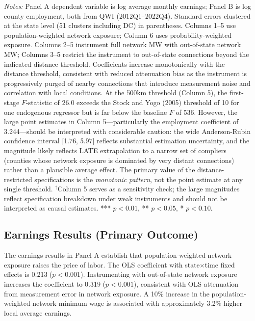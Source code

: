 \documentclass[12pt]{article}
\begin{document}
\begin{table}[t]
\begin{threeparttable}
\begin{tablenotes}[flushleft]
\item \textit{Notes:} Panel A dependent variable is log average monthly earnings; Panel B is log county employment, both from QWI (2012Q1--2022Q4). Standard errors clustered at the state level (51 clusters including DC) in parentheses. Columns 1--5 use population-weighted network exposure; Column 6 uses probability-weighted exposure. Columns 2--5 instrument full network MW with out-of-state network MW; Columns 3--5 restrict the instrument to out-of-state connections beyond the indicated distance threshold. Coefficients increase monotonically with the distance threshold, consistent with reduced attenuation bias as the instrument is progressively purged of nearby connections that introduce measurement noise and correlation with local conditions. At the 500km threshold (Column 5), the first-stage $F$-statistic of 26.0 exceeds the Stock and Yogo (2005) threshold of 10 for one endogenous regressor but is far below the baseline $F$ of 536. However, the large point estimates in Column 5---particularly the employment coefficient of 3.244---should be interpreted with considerable caution: the wide Anderson-Rubin confidence interval [1.76, 5.97] reflects substantial estimation uncertainty, and the magnitude likely reflects LATE extrapolation to a narrow set of compliers (counties whose network exposure is dominated by very distant connections) rather than a plausible average effect. The primary value of the distance-restricted specifications is the \textit{monotonic pattern}, not the point estimate at any single threshold. $^{\dagger}$Column 5 serves as a sensitivity check; the large magnitudes reflect specification breakdown under weak instruments and should not be interpreted as causal estimates. *** $p<0.01$, ** $p<0.05$, * $p<0.10$.
\end{tablenotes}
\end{threeparttable}
\end{table}

\subsection{Earnings Results (Primary Outcome)}

The earnings results in Panel A establish that population-weighted network exposure raises the price of labor. The OLS coefficient with state$\times$time fixed effects is 0.213 ($p < 0.001$). Instrumenting with out-of-state network exposure increases the coefficient to 0.319 ($p < 0.001$), consistent with OLS attenuation from measurement error in network exposure. A 10\% increase in the population-weighted network minimum wage is associated with approximately 3.2\% higher local average earnings.
\end{document}
